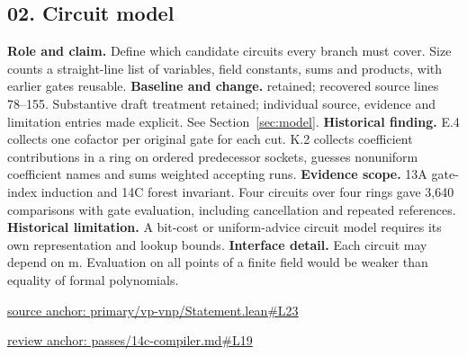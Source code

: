 \documentclass[11pt,letterpaper]{article}
\theoremstyle{definition}\newtheorem{definition}[theorem]{Definition}\newtheorem{example}[theorem]{Example}
\theoremstyle{remark}\newtheorem{remark}[theorem]{Remark}
\begin{document}
\subsection*{02. Circuit model}
\textbf{Role and claim.} Define which candidate circuits every branch must cover. Size counts a straight-line list of variables, field constants, sums and products, with earlier gates reusable.
\textbf{Baseline and change.} retained; recovered source lines 78--155. Substantive draft treatment retained; individual source, evidence and limitation entries made explicit. See Section~\ref{sec:model}.
\textbf{Historical finding.} E.4 collects one cofactor per original gate for each cut. K.2 collects coefficient contributions in a ring on ordered predecessor sockets, guesses nonuniform coefficient names and sums weighted accepting runs.
\textbf{Evidence scope.} 13A gate-index induction and 14C forest invariant. Four circuits over four rings gave 3,640 comparisons with gate evaluation, including cancellation and repeated references.
\textbf{Historical limitation.} A bit-cost or uniform-advice circuit model requires its own representation and lookup bounds.
\textbf{Interface detail.} Each circuit may depend on m. Evaluation on all points of a finite field would be weaker than equality of formal polynomials.
\par\href{https://github.com/nousentllc/VP-VNP-Review/blob/8a7976933b6b2b4ffda1ad3a0dfb5fc6b6f023e8/primary/vp-vnp/Statement.lean\#L23}{source anchor: primary/vp-vnp/Statement.lean\#L23}
\par\href{https://github.com/nousentllc/VP-VNP-Review/blob/8a7976933b6b2b4ffda1ad3a0dfb5fc6b6f023e8/passes/14c-compiler.md\#L19}{review anchor: passes/14c-compiler.md\#L19}
\goodbreak
\end{document}
